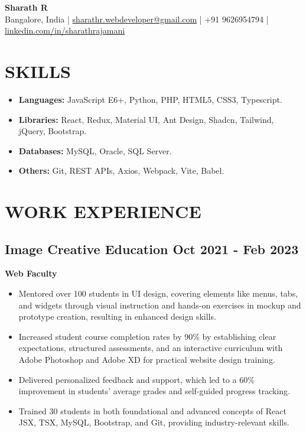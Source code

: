 \documentclass[a4paper,10pt]{article}
\newcommand{\dateright}[1]{\hfill \small \textbf{#1}}
\begin{document}
\begin{center}
    {\LARGE \textbf{Sharath R}} \\
    \vspace{0.2em}
    Bangalore, India |
    \small \href{mailto:sharath.rajamani@gmail.com}{{sharathr.webdeveloper@gmail.com}} |
    +91 9626954794 |
    \href{https://www.linkedin.com/in/sharathrajamani}{{linkedin.com/in/sharathrajamani}}\end{center}


\section*{SKILLS}
\begin{itemize}
    \item \textbf{Languages:} JavaScript E6+, Python, PHP, HTML5, CSS3, Typescript.
    \item \textbf{Libraries:} React, Redux, Material UI, Ant Design, Shadcn, Tailwind, jQuery, Bootstrap.
    \item \textbf{Databases:} MySQL, Oracle, SQL Server.
    \item \textbf{Others:} Git, REST APIs, Axios, Webpack, Vite, Babel.
\end{itemize}

\section*{WORK EXPERIENCE}
\subsection*{Image Creative Education \dateright{Oct 2021 - Feb 2023}}
\noindent \textbf{Web Faculty}
\begin{itemize}
\item Mentored over 100 students in UI design, covering elements like menus, tabs, and widgets through visual instruction and hands-on exercises in mockup and prototype creation, resulting in enhanced design skills.
\item Increased student course completion rates by 90\% by establishing clear expectations, structured assessments, and an interactive curriculum with Adobe Photoshop and Adobe XD for practical website design training.
\item Delivered personalized feedback and support, which led to a 60\% improvement in students' average grades and self-guided progress tracking.
\item Trained 30 students in both foundational and advanced concepts of React JSX, TSX, MySQL, Bootstrap, and Git, providing industry-relevant skills.
\end{itemize}
\end{document}
